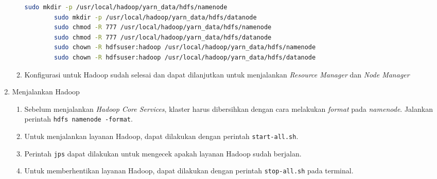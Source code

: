 \begin{enumerate}
\begin{enumerate}
\begin{lstlisting}[language=bash]
		sudo mkdir -p /usr/local/hadoop/yarn_data/hdfs/namenode
		sudo mkdir -p /usr/local/hadoop/yarn_data/hdfs/datanode
		sudo chmod -R 777 /usr/local/hadoop/yarn_data/hdfs/namenode
		sudo chmod -R 777 /usr/local/hadoop/yarn_data/hdfs/datanode
		sudo chown -R hdfsuser:hadoop /usr/local/hadoop/yarn_data/hdfs/namenode
		sudo chown -R hdfsuser:hadoop /usr/local/hadoop/yarn_data/hdfs/datanode
      \end{lstlisting}
    \item Konfigurasi untuk Hadoop sudah selesai dan dapat dilanjutkan untuk menjalankan \textit{Resource Manager} dan \textit{Node Manager}
  \end{enumerate}
  \item Menjalankan Hadoop
  \begin{enumerate}
    \item Sebelum menjalankan \textit{Hadoop Core Services}, klaster harus dibersihkan dengan cara melakukan \textit{format} pada \textit{namenode}. Jalankan perintah \verb|hdfs namenode -format|.
    \item Untuk menjalankan layanan Hadoop, dapat dilakukan dengan perintah \verb|start-all.sh|.
    \item Perintah \verb|jps| dapat dilakukan untuk mengecek apakah layanan Hadoop sudah berjalan.
    \item Untuk memberhentikan layanan Hadoop, dapat dilakukan dengan perintah \verb|stop-all.sh| pada terminal.
  \end{enumerate}
\end{enumerate}
